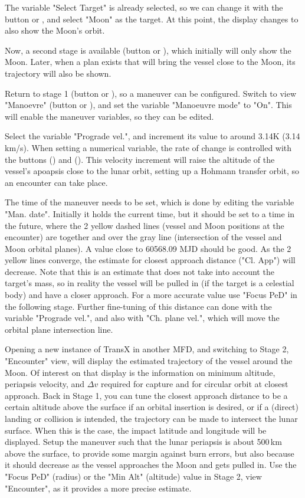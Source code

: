 \documentclass[Orbiter User Manual.tex]{subfiles}
\begin{document}
The variable "Select Target" is already selected, so we can change it with the
button \mfdbtn{++} or \mfdkey{=}, and select "Moon" as the target. At this
point, the display changes to also show the Moon's orbit.

Now, a second stage is available (button  or ), which
initially will only show the Moon. Later, when a plan exists that will bring the
vessel close to the Moon, its trajectory will also be shown.

Return to stage 1 (button  or ), so a maneuver can be
configured. Switch to view "Manoevre" (button  or ), and
set the variable "Manoeuvre mode" to "On". This will enable the maneuver
variables, so they can be edited.

Select the variable "Prograde vel.", and increment its value to around 3.14K
(3.14\,km/s). When setting a numerical variable, the rate of change is
controlled with the buttons  (\mfdkey{\{}) and 
(\mfdkey{\}}). This velocity increment will raise the altitude of the vessel's
apoapsis close to the lunar orbit, setting up a Hohmann transfer orbit, so an
encounter can take place.

The time of the maneuver needs to be set, which is done by editing the variable
"Man. date". Initially it holds the current time, but it should be set to a time
in the future, where the 2 yellow dashed lines (vessel and Moon positions at the
encounter) are together and over the gray line (intersection of the vessel and
Moon orbital planes). A value close to 60568.09 MJD should be good. As the 2
yellow lines converge, the estimate for closest approach distance ("Cl. App")
will decrease. Note that this is an estimate that does not take into account the
target's mass, so in reality the vessel will be pulled in (if the target is a
celestial body) and have a closer approach. For a more accurate value use
"Focus PeD" in the following stage. Further fine-tuning of this distance can
done with the variable "Prograde vel.", and also with "Ch. plane vel.", which
will move the orbital plane intersection line.

Opening a new instance of TransX in another MFD, and switching to Stage 2,
"Encounter" view, will display the estimated trajectory of the vessel around the
Moon. Of interest on that display is the information on minimum altitude,
periapsis velocity, and $\Delta v$ required for capture and for circular orbit
at closest approach. Back in Stage 1, you can tune the closest approach distance
to be a certain altitude above the surface if an orbital insertion is desired,
or if a (direct) landing or collision is intended, the trajectory can be made to
intersect the lunar surface. When this is the case, the impact latitude and
longitude will be displayed. Setup the maneuver such that the lunar periapsis is
about 500\,km above the surface, to provide some margin against burn errors, but
also because it should decrease as the vessel approaches the Moon and gets
pulled in. Use the "Focus PeD" (radius) or the "Min Alt" (altitude) value in
Stage 2, view "Encounter", as it provides a more precise estimate.
\end{document}
